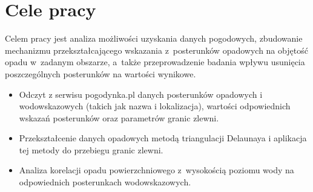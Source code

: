 \section{Cele pracy}
Celem pracy jest analiza możliwości uzyskania danych pogodowych, zbudowanie mechanizmu przekształcającego wskazania z~posterunków opadowych na objętość opadu w~zadanym obszarze, a~także przeprowadzenie badania wpływu usunięcia poszczególnych posterunków na wartości wynikowe.

\begin{itemize}
\item
Odczyt z serwisu pogodynka.pl danych posterunków opadowych i wodowskazowych (takich jak nazwa i lokalizacja), wartości odpowiednich wskazań posterunków oraz parametrów granic zlewni.
\item
Przekształcenie danych opadowych metodą triangulacji Delaunaya i aplikacja tej metody do przebiegu granic zlewni.
\item
Analiza korelacji opadu powierzchniowego z~wysokością poziomu wody na odpowiednich posterunkach wodowskazowych.
\end{itemize}